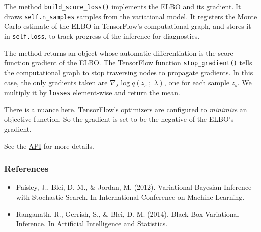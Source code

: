 The method \texttt{build_score_loss()} implements the ELBO and its
gradient. It draws \texttt{self.n_samples} samples from the
variational model. It registers the Monte Carlo
estimate of the ELBO in TensorFlow's computational graph, and stores it
in \texttt{self.loss}, to track progress of the inference for diagnostics.

The method returns an object whose automatic differentiation is the
score function gradient of the ELBO. The TensorFlow function
\texttt{stop_gradient()} tells the computational graph to stop
traversing nodes to propagate gradients. In this case,
the only gradients taken are $\nabla_\lambda \log q(z_s\;;\;\lambda)$,
one for each sample $z_s$. We multiply it by \texttt{losses}
element-wise and return the mean.

There is a nuance here. TensorFlow's optimizers are configured to
\emph{minimize} an objective function. So the gradient is set to be
the negative of the ELBO's gradient.

See the \href{api/}{API} for more details.

\subsubsection{References}\label{references}

\begin{itemize}
\item
  Paisley, J., Blei, D. M., & Jordan, M. (2012). Variational Bayesian
  Inference with Stochastic Search. In International Conference on
  Machine Learning.
\item
  Ranganath, R., Gerrish, S., & Blei, D. M. (2014). Black Box
  Variational Inference. In Artificial Intelligence and Statistics.
\end{itemize}
